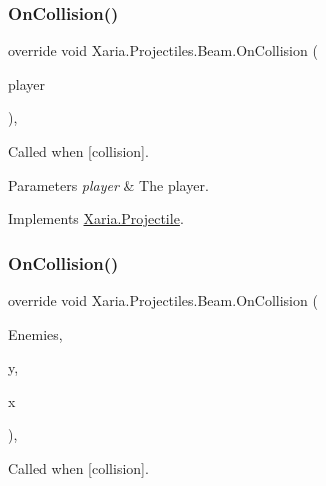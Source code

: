 \subsubsection{\texorpdfstring{On\+Collision()}{OnCollision()}\hspace{0.1cm}{\footnotesize\ttfamily [1/2]}}
{\footnotesize\ttfamily override void Xaria.\+Projectiles.\+Beam.\+On\+Collision (\begin{DoxyParamCaption}\item[{ref \hyperlink{classXaria_1_1Player}{Player}}]{player }\end{DoxyParamCaption})\hspace{0.3cm}{\ttfamily [inline]}, {\ttfamily [virtual]}}



Called when \mbox{[}collision\mbox{]}. 


\begin{DoxyParams}{Parameters}
{\em player} & The player.\\
\hline
\end{DoxyParams}


Implements \hyperlink{classXaria_1_1Projectile_a57ef6f4c3545ab6f1346b36949dcd3d8}{Xaria.\+Projectile}.

\mbox{\label{classXaria_1_1Projectiles_1_1Beam_a48ab1c618b60104761ef1f95d040c30c}} 
\subsubsection{\texorpdfstring{On\+Collision()}{OnCollision()}\hspace{0.1cm}{\footnotesize\ttfamily [2/2]}}
{\footnotesize\ttfamily override void Xaria.\+Projectiles.\+Beam.\+On\+Collision (\begin{DoxyParamCaption}\item[{ref List$<$ List$<$ \hyperlink{classXaria_1_1Enemy}{Enemy} $>$$>$}]{Enemies,  }\item[{int}]{y,  }\item[{int}]{x }\end{DoxyParamCaption})\hspace{0.3cm}{\ttfamily [inline]}, {\ttfamily [virtual]}}



Called when \mbox{[}collision\mbox{]}. 



